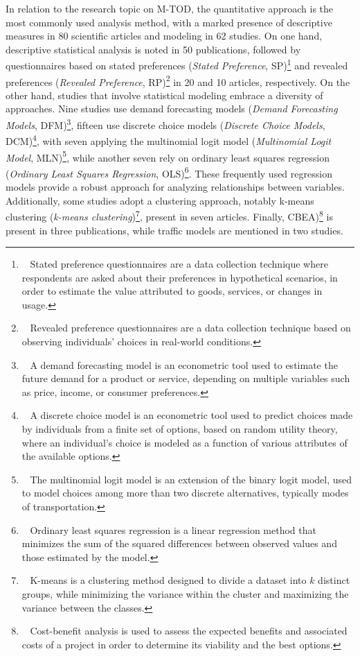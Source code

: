 \begin{refsegment}
In relation to the research topic on \acrshort{M-TOD}, the quantitative approach is the most commonly used analysis method, with a marked presence of descriptive measures in 80 scientific articles and modeling in 62 studies. On one hand, descriptive statistical analysis is noted in 50 publications, followed by questionnaires based on stated preferences (\textsl{Stated Preference}, SP)\footnote{~
    Stated preference questionnaires are a data collection technique where respondents are asked about their preferences in hypothetical scenarios, in order to estimate the value attributed to goods, services, or changes in usage.
} and revealed preferences (\textsl{Revealed Preference}, RP)\footnote{~
    Revealed preference questionnaires are a data collection technique based on observing individuals' choices in real-world conditions.
} in 20 and 10 articles, respectively. On the other hand, studies that involve statistical modeling embrace a diversity of approaches. Nine studies use demand forecasting models (\textsl{Demand Forecasting Models}, DFM)\footnote{~
    A demand forecasting model is an econometric tool used to estimate the future demand for a product or service, depending on multiple variables such as price, income, or consumer preferences.
}, fifteen use discrete choice models (\textsl{Discrete Choice Models}, DCM)\footnote{~
    A discrete choice model is an econometric tool used to predict choices made by individuals from a finite set of options, based on random utility theory, where an individual's choice is modeled as a function of various attributes of the available options.
}, with seven applying the multinomial logit model (\textsl{Multinomial Logit Model}, MLN)\footnote{~
    The multinomial logit model is an extension of the binary logit model, used to model choices among more than two discrete alternatives, typically modes of transportation.
}, while another seven rely on ordinary least squares regression (\textsl{Ordinary Least Squares Regression}, OLS)\footnote{~
    Ordinary least squares regression is a linear regression method that minimizes the sum of the squared differences between observed values and those estimated by the model.
}. These frequently used regression models provide a robust approach for analyzing relationships between variables. Additionally, some studies adopt a clustering approach, notably k-means clustering (\textsl{k-means clustering})\footnote{~
    K-means is a clustering method designed to divide a dataset into $k$ distinct groups, while minimizing the variance within the cluster and maximizing the variance between the classes.
}, present in seven articles. Finally, \acrfull{CBEA})\footnote{~
    Cost-benefit analysis is used to assess the expected benefits and associated costs of a project in order to determine its viability and the best options.
} is present in three publications, while traffic models are mentioned in two studies.%


\end{refsegment}
